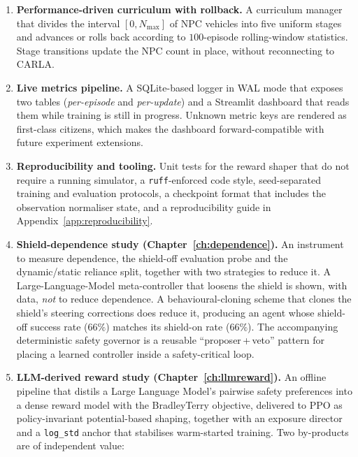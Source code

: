 \begin{enumerate}
        and a shield grace period that stabilise the interaction between the agent, the shield
        and the reward.
  \item \textbf{Performance-driven curriculum with rollback.} A curriculum manager that divides
        the interval \([0, N_{\max}]\) of NPC vehicles into five uniform stages and advances or
        rolls back according to \(100\)-episode rolling-window statistics. Stage transitions
        update the NPC count in place, without reconnecting to CARLA.
  \item \textbf{Live metrics pipeline.} A SQLite-based logger in WAL mode that exposes two
        tables (\emph{per-episode} and \emph{per-update}) and a Streamlit dashboard that reads
        them while training is still in progress. Unknown metric keys are rendered as
        first-class citizens, which makes the dashboard forward-compatible with future
        experiment extensions.
  \item \textbf{Reproducibility and tooling.} Unit tests for the reward shaper that do not
        require a running simulator, a \texttt{ruff}-enforced code style, seed-separated
        training and evaluation protocols, a checkpoint format that includes the observation
        normaliser state, and a reproducibility guide in Appendix~\ref{app:reproducibility}.
  \item \textbf{Shield-dependence study (Chapter~\ref{ch:dependence}).} An instrument to measure
        dependence, the shield-off evaluation probe and the dynamic/static reliance split,
        together with two strategies to reduce it. A Large-Language-Model meta-controller that
        loosens the shield is shown, with data, \emph{not} to reduce dependence. A
        behavioural-cloning scheme that clones the shield's steering corrections does reduce it,
        producing an agent whose shield-off success rate (\(66\%\)) matches its shield-on rate
        (\(66\%\)). The accompanying deterministic safety governor is a reusable
        ``proposer\,+\,veto'' pattern for placing a learned controller inside a safety-critical
        loop.
  \item \textbf{LLM-derived reward study (Chapter~\ref{ch:llmreward}).} An offline pipeline that
        distils a Large Language Model's pairwise safety preferences into a dense reward model
        with the Bradley\textendash Terry objective, delivered to PPO as policy-invariant
        potential-based shaping, together with an exposure director and a \texttt{log\_std}
        anchor that stabilises warm-started training. Two by-products are of independent value:

\end{enumerate}
